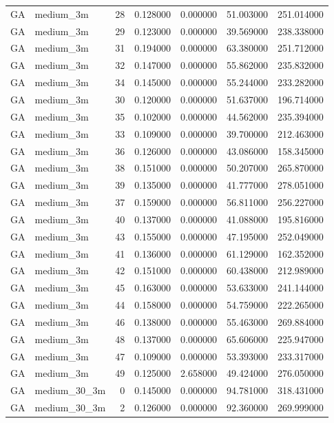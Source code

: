 \begin{tabular}{llrrrrr}
GA & medium_3m & 28 & 0.128000 & 0.000000 & 51.003000 & 251.014000 \\
GA & medium_3m & 29 & 0.123000 & 0.000000 & 39.569000 & 238.338000 \\
GA & medium_3m & 31 & 0.194000 & 0.000000 & 63.380000 & 251.712000 \\
GA & medium_3m & 32 & 0.147000 & 0.000000 & 55.862000 & 235.832000 \\
GA & medium_3m & 34 & 0.145000 & 0.000000 & 55.244000 & 233.282000 \\
GA & medium_3m & 30 & 0.120000 & 0.000000 & 51.637000 & 196.714000 \\
GA & medium_3m & 35 & 0.102000 & 0.000000 & 44.562000 & 235.394000 \\
GA & medium_3m & 33 & 0.109000 & 0.000000 & 39.700000 & 212.463000 \\
GA & medium_3m & 36 & 0.126000 & 0.000000 & 43.086000 & 158.345000 \\
GA & medium_3m & 38 & 0.151000 & 0.000000 & 50.207000 & 265.870000 \\
GA & medium_3m & 39 & 0.135000 & 0.000000 & 41.777000 & 278.051000 \\
GA & medium_3m & 37 & 0.159000 & 0.000000 & 56.811000 & 256.227000 \\
GA & medium_3m & 40 & 0.137000 & 0.000000 & 41.088000 & 195.816000 \\
GA & medium_3m & 43 & 0.155000 & 0.000000 & 47.195000 & 252.049000 \\
GA & medium_3m & 41 & 0.136000 & 0.000000 & 61.129000 & 162.352000 \\
GA & medium_3m & 42 & 0.151000 & 0.000000 & 60.438000 & 212.989000 \\
GA & medium_3m & 45 & 0.163000 & 0.000000 & 53.633000 & 241.144000 \\
GA & medium_3m & 44 & 0.158000 & 0.000000 & 54.759000 & 222.265000 \\
GA & medium_3m & 46 & 0.138000 & 0.000000 & 55.463000 & 269.884000 \\
GA & medium_3m & 48 & 0.137000 & 0.000000 & 65.606000 & 225.947000 \\
GA & medium_3m & 47 & 0.109000 & 0.000000 & 53.393000 & 233.317000 \\
GA & medium_3m & 49 & 0.125000 & 2.658000 & 49.424000 & 276.050000 \\
GA & medium_30_3m & 0 & 0.145000 & 0.000000 & 94.781000 & 318.431000 \\
GA & medium_30_3m & 2 & 0.126000 & 0.000000 & 92.360000 & 269.999000 \\

\end{tabular}
